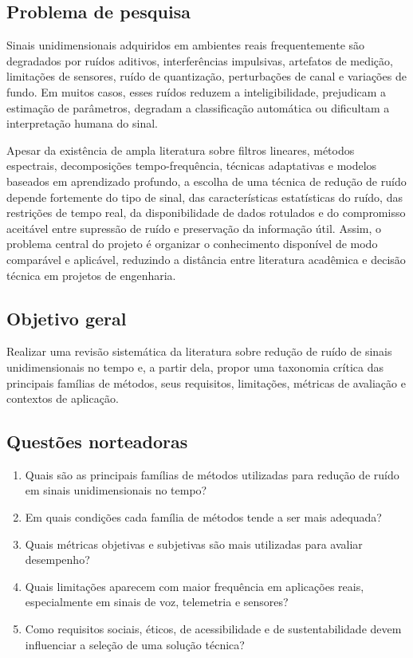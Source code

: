 \subsection{Problema de pesquisa}

Sinais unidimensionais adquiridos em ambientes reais frequentemente são degradados por ruídos aditivos, interferências impulsivas, artefatos de medição, limitações de sensores, ruído de quantização, perturbações de canal e variações de fundo. Em muitos casos, esses ruídos reduzem a inteligibilidade, prejudicam a estimação de parâmetros, degradam a classificação automática ou dificultam a interpretação humana do sinal.

Apesar da existência de ampla literatura sobre filtros lineares, métodos espectrais, decomposições tempo-frequência, técnicas adaptativas e modelos baseados em aprendizado profundo, a escolha de uma técnica de redução de ruído depende fortemente do tipo de sinal, das características estatísticas do ruído, das restrições de tempo real, da disponibilidade de dados rotulados e do compromisso aceitável entre supressão de ruído e preservação da informação útil. Assim, o problema central do projeto é organizar o conhecimento disponível de modo comparável e aplicável, reduzindo a distância entre literatura acadêmica e decisão técnica em projetos de engenharia.

\subsection{Objetivo geral}

Realizar uma revisão sistemática da literatura sobre redução de ruído de sinais unidimensionais no tempo e, a partir dela, propor uma taxonomia crítica das principais famílias de métodos, seus requisitos, limitações, métricas de avaliação e contextos de aplicação.

\subsection{Questões norteadoras}

\begin{enumerate}[label=Q\arabic*.]
    \item Quais são as principais famílias de métodos utilizadas para redução de ruído em sinais unidimensionais no tempo?
    \item Em quais condições cada família de métodos tende a ser mais adequada?
    \item Quais métricas objetivas e subjetivas são mais utilizadas para avaliar desempenho?
    \item Quais limitações aparecem com maior frequência em aplicações reais, especialmente em sinais de voz, telemetria e sensores?
    \item Como requisitos sociais, éticos, de acessibilidade e de sustentabilidade devem influenciar a seleção de uma solução técnica?
\end{enumerate}

